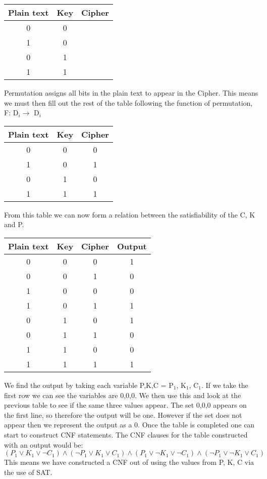 \documentclass[11pt,a4paper]{report}
\begin{document}
\begin{center}
\begin{tabular}{|c|c|c|}
\hline
Plain text & Key & Cipher\\ \hline
0 & 0 & {}\\ \hline
1 & 0 & {}\\ \hline
0 & 1 & {}\\ \hline
1 & 1 & {}\\ \hline
\end{tabular}
\end{center}
Permutation assigns all bits in the plain text to appear in the Cipher. This means we must then fill out the rest of the table following the function of permutation, F: D$_{i} \rightarrow$ D$_{i}$

\begin{center}
\begin{tabular}{|c|c|c|}
\hline
Plain text & Key & Cipher\\ \hline
0 & 0 & 0\\ \hline
1 & 0 & 1\\ \hline
0 & 1 & 0\\ \hline
1 & 1 & 1\\ \hline
\end{tabular}
\end{center}
From this table we can now form a relation between the satisfiability of the C, K and P.


\begin{center}
\begin{tabular}{|c|c|c|c|}
\hline
Plain text & Key & Cipher & Output\\ \hline
0 & 0 & 0 & 1\\ \hline
0 & 0 & 1 & 0\\ \hline
1 & 0 & 0 & 0\\ \hline
1 & 0 & 1 & 1\\ \hline
0 & 1 & 0 & 1\\ \hline
0 & 1 & 1 & 0\\ \hline
1 & 1 & 0 & 0\\ \hline
1 & 1 & 1 & 1\\ \hline
\end{tabular}
\end{center}
We find the output by taking each variable {P,K,C} = {P$_{1}$, K$_{1}$, C$_{1}$}. If we take the first row we can see the variables are {0,0,0}. We then use this and look at the previous table to see if the same three values appear. The set {0,0,0} appears on the first line, so therefore the output will be one. However if the set does not appear then we represent the output as a 0. Once the table is completed one can start to construct CNF statements.
The CNF clauses for the table constructed with an output would be:
\begin{displaymath}
(P_{1} \lor K_{1} \lor \neg C_{1}) \land (\neg P_{1} \lor K_{1} \lor C_{1}) \land (P_{1} \lor \neg K_{1} \lor \neg C_{1}) \land (\neg P_{1} \lor \neg K_{1} \lor C_{1})
\end{displaymath}
This means we have constructed a CNF out of using the values from P, K, C via the use of SAT.
\end{document}
